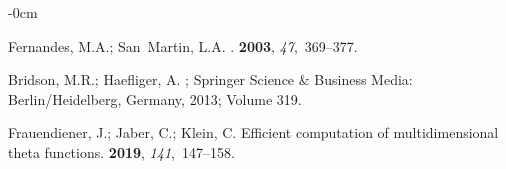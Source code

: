 \documentclass[entropy,article,accept,oneauthor,pdftex,entropy]{Definitions/mdpi}
\begin{document}
\begin{adjustwidth}{-\extralength}{0cm}
\begin{thebibliography}{999}
Fernandes, M.A.; San~Martin, L.A.
.
 {\bf 2003}, {\em 47},~369--377.

Bridson, M.R.; Haefliger, A.
; Springer
  Science \& Business Media:  {Berlin/Heidelberg, Germany,} %
 2013; Volume 319.

Frauendiener, J.; Jaber, C.; Klein, C.
\newblock Efficient computation of multidimensional theta functions.
 {\bf 2019}, {\em
  141},~147--158.

\end{thebibliography}

 
\PublishersNote{}
\end{adjustwidth}
\end{document}
